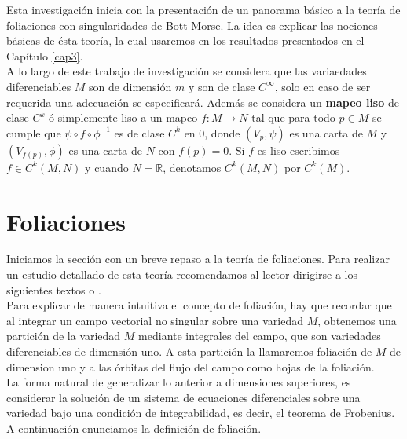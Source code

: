\documentclass[a4paper,10pt]{book}
\begin{document}
Esta investigaci\'on inicia con la presentaci\'on de un panorama b\'asico a la teor\'ia de foliaciones con singularidades de Bott-Morse. La idea es explicar las nociones b\'asicas de \'esta teor\'ia, la cual usaremos en los resultados presentados en el Cap\'itulo \ref{cap3}.\\

A lo largo de este trabajo de investigaci\'on se considera que las variaedades diferenciables $M$ son de dimensi\'on $m$ y son de clase $C^{\infty}$, solo en caso de ser requerida una adecuaci\'on se especificar\'a. Adem\'as se considera un {\bfseries mapeo liso} de clase $C^{k}$ \'o simplemente liso a un mapeo $f:M\to N$ tal que para todo $p\in M$ se cumple que $\psi\circ f\circ\phi^{-1}$ es de clase $C^{k}$ en $0$, donde $(V_{p},\psi)$ es una carta de $M$ y $(V_{f(p)},\phi)$ es una carta de $N$ con $f(p)=0$. Si $f$ es liso escribimos $f\in C^{k}(M,N)$ y cuando $N=\mathbb{R}$, denotamos $C^{k}(M,N)$ por $C^{k}(M)$.       

\section{Foliaciones}\label{1.1}
Iniciamos la secci\'on con un breve repaso a la teor\'ia de foliaciones. Para realizar un estudio detallado de esta teor\'ia recomendamos al lector dirigirse a los siguientes textos \cite{Camacho} o \cite{Molino}. \\

Para explicar de manera intuitiva el concepto de foliaci\'on, hay que recordar que al integrar un campo vectorial no singular sobre una variedad $M$, obtenemos una partici\'on de la variedad $M$ mediante integrales del campo, que son variedades diferenciables de dimensi\'on uno. A esta partici\'on la llamaremos foliaci\'on de $M$ de dimension uno y a las \'orbitas del flujo del campo como hojas de la foliaci\'on. \\

La forma natural de generalizar lo anterior a dimensiones superiores, es considerar la soluci\'on de un sistema de ecuaciones diferenciales sobre una variedad bajo una condici\'on de integrabilidad, es decir, el teorema de Frobenius.\\

A continuaci\'on enunciamos la definici\'on de foliaci\'on.
\end{document}
